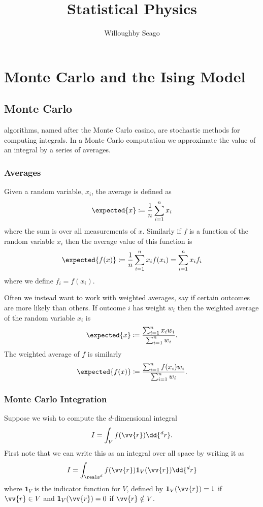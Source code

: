 \documentclass[fleqn]{NotesClass}
\title{Statistical Physics}
\author{Willoughby Seago}
\date{}
\newcommand*{\indicator}{\mathbf{1}}
\begin{document}
    \frontmatter
    \titlepage
    \tableofcontents
    \listoffigures
    \mainmatter
    
    \part{Monte Carlo and the Ising Model}
    \chapter{Monte Carlo}
     algorithms, named after the Monte Carlo casino, are stochastic methods for computing integrals.
    In a Monte Carlo computation we approximate the value of an integral by a series of averages.
    
    \section{Averages}
    Given a random variable, \(x_i\), the average is defined as
    \begin{equation}
        \expected{x} \coloneqq \frac{1}{n} \sum_{i=1}^{n} x_i
    \end{equation}
    where the sum is over all measurements of \(x\).
    Similarly if \(f\) is a function of the random variable \(x_i\) then the average value of this function is
    \begin{equation}
        \expected{f(x)} \coloneqq \frac{1}{n} \sum_{i=1}^{n} x_if(x_i) = \sum_{i=1}^{n} x_if_i
    \end{equation}
    where we define \(f_i = f(x_i)\).
    
    Often we instead want to work with weighted averages, say if certain outcomes are more likely than others.
    If outcome \(i\) has weight \(w_i\) then the weighted average of the random variable \(x_i\) is
    \begin{equation}
        \expected{x} \coloneqq \frac{\sum_{i=1}^{n} x_iw_i}{\sum_{i=1}^{n} w_i}.
    \end{equation}
    The weighted average of \(f\) is similarly
    \begin{equation}
        \expected{f(x)} \coloneqq \frac{\sum_{i=1}^{n} f(x_i)w_i}{\sum_{i=1}^{n}w_i}.
    \end{equation}
    
    \section{Monte Carlo Integration}
    Suppose we wish to compute the \(d\)-dimensional integral
    \begin{equation}
        I = \int_V f(\vv{r}) \dd{^dr}.
    \end{equation}
    First note that we can write this as an integral over all space by writing it as
    \begin{equation}
        I = \int_{\reals^d} f(\vv{r}) \indicator_V(\vv{r}) \dd{^dr}
    \end{equation}
    where \(\indicator_V\) is the indicator function for \(V\), defined by \(\indicator_V(\vv{r}) = 1\) if \(\vv{r} \in V\) and \(\indicator_V(\vv{r}) = 0\) if \(\vv{r} \notin V\).
    
\end{document}
